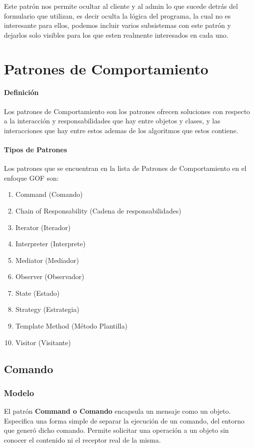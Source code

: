 Este patrón nos permite ocultar al cliente y al admin lo que sucede detrás del formulario que utilizan, es decir oculta la lógica del programa, la cual no es interesante para ellos, podemos incluir varios subsistemas con este patrón y dejarlos solo visibles para los que esten realmente interesados en cada uno. 
\newpage

\section{Patrones de Comportamiento}
\paragraph{Definición}
Los patrones de Comportamiento son los patrones ofrecen soluciones con respecto a la interacción y responsabilidades que hay entre objetos y clases, y las interacciones que hay entre estos ademas de los algoritmos que estos contiene.
\paragraph{Tipos de Patrones}
Los patrones que se encuentran en la lista de Patrones de Comportamiento en el enfoque GOF son:
\begin{enumerate}
	\item Command (Comando)
	\item Chain of Responsability (Cadena de responsabilidades)
	\item Iterator (Iterador)
	\item Interpreter (Interprete)
	\item Mediator (Mediador)
	\item Observer (Observador)
	\item State (Estado)
	\item Strategy (Estrategia)
	\item Template Method (Método Plantilla)
	\item Visitor (Visitante)
\end{enumerate}

\subsection{Comando}
\subsubsection{Modelo}
El patrón \textbf{Command o Comando} encapsula un mensaje como un objeto. Especifica una forma simple de separar la ejecución de un comando, del entorno que generó dicho comando. Permite solicitar una operación a un objeto sin conocer el contenido ni el receptor real de la misma. 

